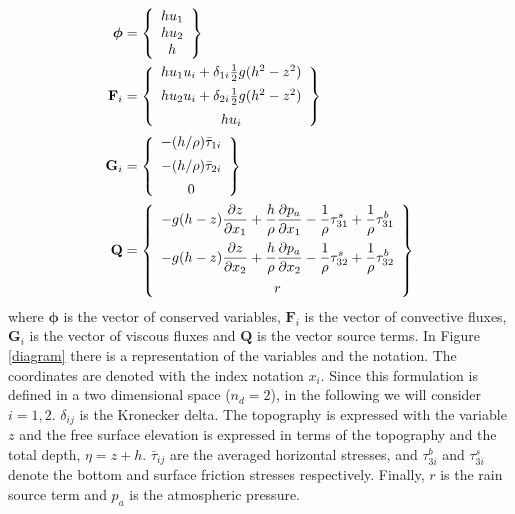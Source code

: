 \documentclass[a4paper,12pt]{elsarticle}
\newcommand{\pder}[2]{\frac{\partial#1}{\partial#2}}
\begin{document}
\begin{subequations}\label{variables_and_fluxes}
\allowdisplaybreaks
\begin{align}
\bm{\phi} &= \left\{
    \begin{array}{c}
        hu_1 \\
        hu_2 \\
        h
    \end{array}\right\} \\
\mathbf{F}_i &= \left\{
    \begin{array}{c}
        hu_1u_i + \delta_{1i}\frac{1}{2}g(h^2 - z^2) \\ [5pt]
        hu_2u_i + \delta_{2i}\frac{1}{2}g(h^2 - z^2) \\ [5pt]
        hu_i
    \end{array}\right\} \\
\mathbf{G}_i &= \left\{
    \begin{array}{c}
        -(h/\rho) \bar{\tau}_{1i} \\ [5pt]
        -(h/\rho) \bar{\tau}_{2i} \\ [5pt]
        0
    \end{array}\right\} \\
\mathbf{Q} &= \left\{
    \begin{array}{c}
        \displaystyle -g(h-z)\pder{z}{x_1} + \frac{h}{\rho}\pder{p_a}{x_1}
        - \frac{1}{\rho}\tau^s_{31} + \frac{1}{\rho}\tau^b_{31} \\ [10pt]
        \displaystyle -g(h-z)\pder{z}{x_2} + \frac{h}{\rho}\pder{p_a}{x_2}
        - \frac{1}{\rho}\tau^s_{32} + \frac{1}{\rho}\tau^b_{32} \\ [10pt]
        r
    \end{array}\right\}
\end{align}
\end{subequations}
where $\bm{\phi}$ is the vector of conserved variables, $\mathbf{F}_i$ is the vector of convective fluxes, $\mathbf{G}_i$ is the vector of viscous fluxes and $\mathbf{Q}$ is the vector source terms. In Figure \ref{diagram} there is a representation of the variables and the notation. The coordinates are denoted with the index notation $x_i$. Since this formulation is defined in a two dimensional space ($n_d=2$), in the following we will consider $i=1,2$.
$\delta_{ij}$ is the Kronecker delta. The topography is expressed with the variable $z$ and the free surface elevation is expressed in terms of the topography and the total depth, $\eta = z + h$. $\bar{\tau}_{ij}$ are the averaged horizontal stresses, and $\tau^b_{3i}$ and $\tau^s_{3i}$ denote the bottom and surface friction stresses respectively. Finally, $r$ is the rain source term and $p_a$ is the atmospheric pressure.
\end{document}
